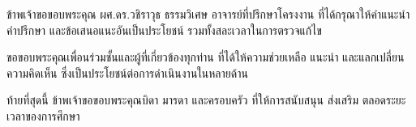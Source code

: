 ข้าพเจ้าขอขอบพระคุณ ผศ.ดร.วชิราวุธ ธรรมวิเศษ อาจารย์ที่ปรึกษาโครงงาน
ที่ได้กรุณาให้คำแนะนำ คำปรึกษา และข้อเสนอแนะอันเป็นประโยชน์
รวมทั้งสละเวลาในการตรวจแก้ไข

ขอขอบพระคุณเพื่อนร่วมชั้นและผู้ที่เกี่ยวข้องทุกท่าน
ที่ได้ให้ความช่วยเหลือ แนะนำ และแลกเปลี่ยนความคิดเห็น
ซึ่งเป็นประโยชน์ต่อการดำเนินงานในหลายด้าน

ท้ายที่สุดนี้ ข้าพเจ้าขอขอบพระคุณบิดา มารดา และครอบครัว
ที่ให้การสนับสนุน ส่งเสริม ตลอดระยะเวลาของการศึกษา
